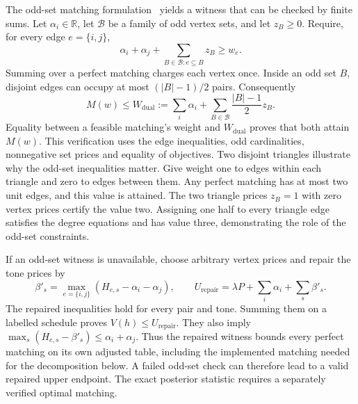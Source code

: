 \documentclass[10pt,letterpaper]{article}
\begin{document}
The odd-set matching formulation~\cite{edmonds} yields a witness that can be checked by finite sums. Let $\alpha_i\in\mathbb R$, let $\mathcal B$ be a family of odd vertex sets, and let $z_B\ge0$. Require, for every edge $e=\{i,j\}$,
\begin{equation}
 \alpha_i+\alpha_j+\sum_{B\in\mathcal B:e\subseteq B}z_B\ge w_e.
 \label{supp:odd-inequality}
\end{equation}
Summing over a perfect matching charges each vertex once. Inside an odd set $B$, disjoint edges can occupy at most $(|B|-1)/2$ pairs. Consequently
\begin{equation}
 M(w)\le W_{\mathrm{dual}}
 :=\sum_i\alpha_i+\sum_{B\in\mathcal B}\frac{|B|-1}{2}z_B.
 \label{supp:odd-objective}
\end{equation}
Equality between a feasible matching's weight and $W_{\mathrm{dual}}$ proves that both attain $M(w)$. This verification uses the edge inequalities, odd cardinalities, nonnegative set prices and equality of objectives. Two disjoint triangles illustrate why the odd-set inequalities matter. Give weight one to edges within each triangle and zero to edges between them. Any perfect matching has at most two unit edges, and this value is attained. The two triangle prices $z_B=1$ with zero vertex prices certify the value two. Assigning one half to every triangle edge satisfies the degree equations and has value three, demonstrating the role of the odd-set constraints.

If an odd-set witness is unavailable, choose arbitrary vertex prices and repair the tone prices by
\begin{equation}
 \beta'_s=\max_{e=\{i,j\}}(H_{e,s}-\alpha_i-\alpha_j),\qquad
 U_{\mathrm{repair}}=\lambda P+\sum_i\alpha_i+\sum_s\beta'_s.
 \label{supp:p3}
\end{equation}
The repaired inequalities hold for every pair and tone. Summing them on a labelled schedule proves $V(h)\le U_{\mathrm{repair}}$. They also imply $\max_s(H_{e,s}-\beta'_s)\le\alpha_i+\alpha_j$. Thus the repaired witness bounds every perfect matching on its own adjusted table, including the implemented matching needed for the decomposition below. A failed odd-set check can therefore lead to a valid repaired upper endpoint. The exact posterior statistic requires a separately verified optimal matching.
\end{document}
